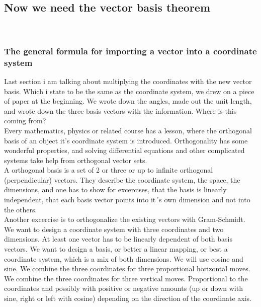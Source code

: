 \documentclass[a4paper]{article}
\begin{document}
\subsection{Now we need the vector basis theorem}\\

\subsubsection{The general formula for importing a vector into a coordinate system}

Last section i am talking about multiplying the coordinates with the new vector basis. Which i state to be the same as the coordinate system, we drew on a piece of paper at the beginning. We wrote down the angles, made out the unit length, and wrote down the three basis vectors with the information. Where is this coming from?\\

Every mathematics, physics or related course has a lesson, where the orthogonal basis of an object it's coordinate system is introduced. Orthogonality has some wonderful properties, and solving differential equations and other complicated systems take help from orthogonal vector sets.\\

A orthogonal basis is a set of 2 or three or up to infinite orthogonal (perpendicular) vectors. They describe the coordinate system, the space, the dimensions, and one has to show for excercises, that the basis is linearly independent, that each basis vector points into it´s own dimension and not into the others. \\

Another excercise is to orthogonalize the existing vectors with Gram-Schmidt. \\

We want to design a coordinate system with three coordinates and two dimensions. At least one vector has to be linearly dependent of both basis vectors. We want to design a basis, or better a linear mapping, or best a coordinate system, which is a mix of both dimensions. We will use cosine and sine. We combine the three coordinates for three proportional horizontal moves. We combine the three coordinates for three vertical moves. Proportional to the coordinates and possibly with positive or negative amounts (up or down with sine, right or left with cosine) depending on the direction of the coordinate axis.\\
\end{document}

